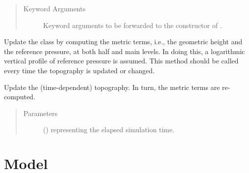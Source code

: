 \documentclass[letterpaper,10pt,english]{sphinxmanual}
\begin{document}
\begin{fulllineitems}
\begin{fulllineitems}
\begin{quote}
\begin{description}
\begin{itemize}
\end{itemize}

\item[{Keyword Arguments}] \leavevmode
{} \textendash{} Keyword arguments to be forwarded to the constructor of {\hyperref[\detokenize{api:grids.topography.Topography2d}]{}}.

\end{description}\end{quote}

\end{fulllineitems}


\begin{fulllineitems}
\label{\detokenize{api:grids.sleve.SLEVE3d._update_metric_terms}}
Update the class by computing the metric terms, i.e., the geometric height and the reference pressure,
at both half and main levels. In doing this, a logarithmic vertical profile of reference pressure is assumed.
This method should be called every time the topography is updated or changed.

\end{fulllineitems}


\begin{fulllineitems}
\label{\detokenize{api:grids.sleve.SLEVE3d.update_topography}}
Update the (time-dependent) topography. In turn, the metric terms are re-computed.
\begin{quote}\begin{description}
\item[{Parameters}] \leavevmode
{} () \textendash{}  representing the elapsed simulation time.

\end{description}\end{quote}

\end{fulllineitems}


\end{fulllineitems}



\section{Model}
\label{\detokenize{api:model}}
\end{document}
